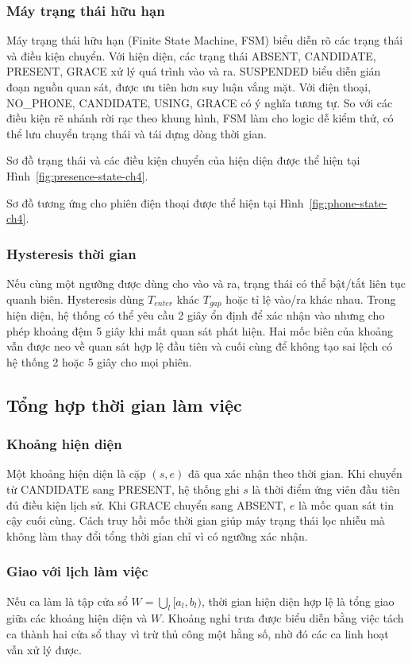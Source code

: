 \subsubsection{Máy trạng thái hữu hạn}
Máy trạng thái hữu hạn (Finite State Machine, FSM) biểu diễn rõ các trạng thái và điều kiện chuyển. Với hiện diện, các trạng thái ABSENT, CANDIDATE, PRESENT, GRACE xử lý quá trình vào và ra. SUSPENDED biểu diễn gián đoạn nguồn quan sát, được ưu tiên hơn suy luận vắng mặt. Với điện thoại, NO\_PHONE, CANDIDATE, USING, GRACE có ý nghĩa tương tự. So với các điều kiện rẽ nhánh rời rạc theo khung hình, FSM làm cho logic dễ kiểm thử, có thể lưu chuyển trạng thái và tái dựng dòng thời gian.

Sơ đồ trạng thái và các điều kiện chuyển của hiện diện được thể hiện tại Hình~\ref{fig:presence-state-ch4}.

Sơ đồ tương ứng cho phiên điện thoại được thể hiện tại Hình~\ref{fig:phone-state-ch4}.

\subsubsection{Hysteresis thời gian}
Nếu cùng một ngưỡng được dùng cho vào và ra, trạng thái có thể bật/tắt liên tục quanh biên. Hysteresis dùng $T_{enter}$ khác $T_{gap}$ hoặc tỉ lệ vào/ra khác nhau. Trong hiện diện, hệ thống có thể yêu cầu 2 giây ổn định để xác nhận vào nhưng cho phép khoảng đệm 5 giây khi mất quan sát phát hiện. Hai mốc biên của khoảng vẫn được neo về quan sát hợp lệ đầu tiên và cuối cùng để không tạo sai lệch có hệ thống 2 hoặc 5 giây cho mọi phiên.

\subsection{Tổng hợp thời gian làm việc}
\subsubsection{Khoảng hiện diện}
Một khoảng hiện diện là cặp $(s,e)$ đã qua xác nhận theo thời gian. Khi chuyển từ CANDIDATE sang PRESENT, hệ thống ghi $s$ là thời điểm ứng viên đầu tiên đủ điều kiện lịch sử. Khi GRACE chuyển sang ABSENT, $e$ là mốc quan sát tin cậy cuối cùng. Cách truy hồi mốc thời gian giúp máy trạng thái lọc nhiễu mà không làm thay đổi tổng thời gian chỉ vì có ngưỡng xác nhận.

\subsubsection{Giao với lịch làm việc}
Nếu ca làm là tập cửa sổ $W=\bigcup_l[a_l,b_l)$, thời gian hiện diện hợp lệ là tổng giao giữa các khoảng hiện diện và $W$. Khoảng nghỉ trưa được biểu diễn bằng việc tách ca thành hai cửa sổ thay vì trừ thủ công một hằng số, nhờ đó các ca linh hoạt vẫn xử lý được.

